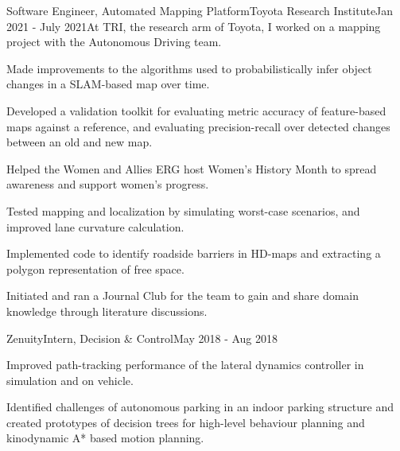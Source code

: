 \begin{cventries}
  \cventrylongwithdot
    {Software Engineer, Automated Mapping Platform}{Toyota Research Institute}{Jan 2021 - July 2021}{At TRI, the research arm of Toyota, I worked on a mapping project with the Autonomous Driving team.}
    {
      \begin{cvitems}
        \item Made improvements to the algorithms used to probabilistically infer object changes in a SLAM-based map over time.
        \item Developed a validation toolkit for evaluating metric accuracy of feature-based maps against a reference, and evaluating precision-recall over detected changes between an old and new map.
        \item Helped the Women and Allies ERG host Women's History Month to spread awareness and support women's progress.
      \end{cvitems}
    }
   {
      \begin{cvitems}
      \item Tested mapping and localization by simulating worst-case scenarios, and improved lane curvature calculation.
      \item Implemented code to identify roadside barriers in HD-maps and extracting a polygon representation of free space.
      \item Initiated and ran a Journal Club for the team to gain and share domain knowledge through literature discussions.
      \end{cvitems}
    }
  \cventry
    {Zenuity}{Intern, Decision \& Control}{May 2018 - Aug 2018}
    {
      \begin{cvitems}
        \item Improved path-tracking performance of the lateral dynamics controller in simulation and on vehicle.
        \item Identified challenges of autonomous parking in an indoor parking structure and created prototypes of decision trees for high-level behaviour planning and kinodynamic A* based motion planning.
      \end{cvitems}
    }
    
 
\end{cventries}
